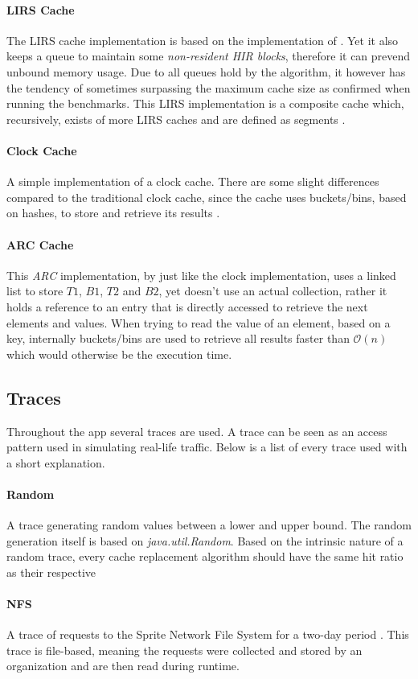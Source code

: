 \documentclass[pdftex,a4paper,12pt,twoside]{report}
\begin{document}
\paragraph{LIRS Cache} The LIRS cache implementation is based on the implementation of \cite{jiang2002lirs}. Yet it also keeps a queue to maintain some \emph{non-resident HIR blocks}, therefore it can prevend unbound memory usage. Due to all queues hold by the algorithm, it however has the tendency of sometimes surpassing the maximum cache size as confirmed when running the benchmarks. This LIRS implementation is a composite cache which, recursively, exists of more LIRS caches and are defined as segments \citep{cachelirs_oak}.
\paragraph{Clock Cache} A simple implementation of a clock cache. There are some slight differences compared to the traditional clock cache, since the cache uses buckets/bins, based on hashes, to store and retrieve its results \citep{cache2k_clock}.
\paragraph{ARC Cache} This \emph{ARC} implementation, by \cite{cache2k_arc} just like the clock implementation, uses a linked list to store $T1$, $B1$, $T2$ and $B2$, yet doesn't use an actual collection, rather it holds a reference to an entry that is directly accessed to retrieve the next elements and values. When trying to read the value of an element, based on a key, internally buckets/bins are used to retrieve all results faster than $\mathcal{O}(n)$ which would otherwise be the execution time.
\subsection{Traces}
Throughout the app several traces are used. A trace can be seen as an access pattern used in simulating real-life traffic. Below is a list of every trace used with a short explanation.
\paragraph{Random} A trace generating random values between a lower and upper bound. The random generation itself is based on \emph{java.util.Random}. Based on the intrinsic nature of a random trace, every cache replacement algorithm should have the same hit ratio as their respective 
\paragraph{NFS} A trace of requests to the Sprite Network File System for a two-day period \citep{jiang2005clock}. This trace is file-based, meaning the requests were collected and stored by an organization and are then read during runtime.
\end{document}
